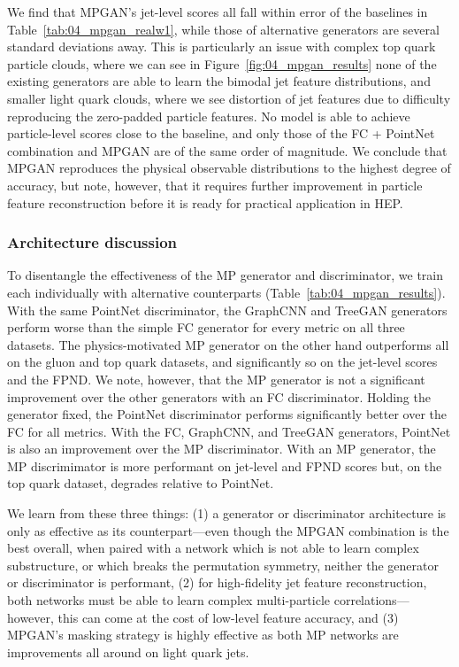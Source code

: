 We find that MPGAN's jet-level \wass scores all fall within error of the baselines in Table~\ref{tab:04_mpgan_realw1}, while those of alternative generators are several standard deviations away.
This is particularly an issue with complex top quark particle clouds, where we can see in Figure~\ref{fig:04_mpgan_results} none of the existing generators are able to learn the bimodal jet feature distributions, and smaller light quark clouds, where we see distortion of jet features due to difficulty reproducing the zero-padded particle features.
No model is able to achieve particle-level scores close to the baseline, and only those of the FC + PointNet combination and MPGAN are of the same order of magnitude.
We conclude that MPGAN reproduces the physical observable distributions to the highest degree of accuracy, but note, however, that it requires further improvement in particle feature reconstruction before it is ready for practical application in HEP.

\subsubsection{Architecture discussion}

To disentangle the effectiveness of the MP generator and discriminator, we train each individually with alternative counterparts (Table~\ref{tab:04_mpgan_results}).
With the same PointNet discriminator, the GraphCNN and TreeGAN generators perform worse than the simple FC generator for every metric on all three datasets.
The physics-motivated MP generator on the other hand outperforms all on the gluon and top quark datasets, and significantly so on the jet-level \wass scores and the FPND.
We note, however, that the MP generator is not a significant improvement over the other generators with an FC discriminator.
Holding the generator fixed, the PointNet discriminator performs significantly better over the FC for all metrics.
With the FC, GraphCNN, and TreeGAN generators, PointNet is also an improvement over the MP discriminator.
With an MP generator, the MP discrimimator is more performant on jet-level \wass and FPND scores but, on the top quark dataset, degrades \wassp relative to PointNet.

We learn from these three things: (1) a generator or discriminator architecture is only as effective as its counterpart---even though the MPGAN combination is the best overall, when paired with a network which is not able to learn complex substructure, or which breaks the permutation symmetry, neither the generator or discriminator is performant, (2) for high-fidelity jet feature reconstruction, both networks must be able to learn complex multi-particle correlations---however, this can come at the cost of low-level feature accuracy, and (3) MPGAN's masking strategy is highly effective as both MP networks are improvements all around on light quark jets.


